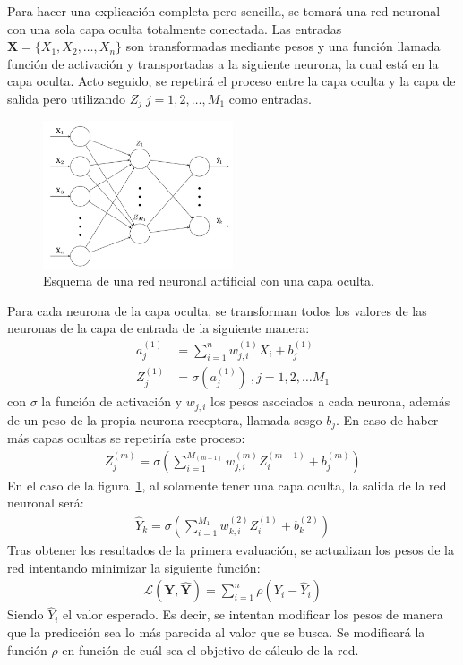 \documentclass[11pt]{book}
\theoremstyle{plain} %
\theoremstyle{definition} %
\begin{document}
Para hacer una explicación completa pero sencilla, se tomará una red neuronal con 
una sola capa oculta totalmente conectada. Las entradas 
$ \mathbf{X}= \{X_{1}, X_{2}, \dots, X_{n} \}$  son 
transformadas mediante pesos y una función llamada función de activación y transportadas 
a la siguiente neurona, la cual está en la capa oculta. Acto seguido, se repetirá el proceso 
entre la capa oculta y la capa de salida pero utilizando $Z_j \; j= 1, 2, \dots, M_1$ como 
entradas.

\begin{figure}[h]
    \centering
    \includegraphics[width=0.5\textwidth]{picture1.jpg} 
    \caption{Esquema de una red neuronal artificial con una capa oculta.}
    \label{fig:miImagen} 
\end{figure}

Para cada neurona de la capa oculta, se transforman todos los valores de las neuronas 
de la capa de entrada de la siguiente manera:
\begin{align*}
    a_j^{(1)} &= \sum_{i=1}^n w_{j,i}^{(1)}X_i+b_{j}^{(1)}\\
    Z_j^{(1)} &= \sigma(a_j^{(1)})\:, j = 1, 2, \dots M_1
\end{align*}
con $\sigma$ la función de activación y $w_{j,i}$ los pesos asociados a cada neurona, 
además de un peso de la propia neurona receptora, llamada sesgo $b_{j}$. En caso de 
haber más  capas ocultas se repetiría este proceso:
\begin{align*}
    Z_j^{(m)} = \sigma\left(\sum_{i = 1}^{M_{(m-1)}}w_{j,i}^{(m)}Z_i^{(m-1)}+b_{j}^{(m)}\right)
\end{align*}
En el caso de la figura~\ref{fig:miImagen}, al solamente tener una capa oculta, la salida de la red 
neuronal será:
\begin{align*}
\hat{Y}_k = \sigma\left(\sum_{i=1}^{M_1} w_{k,i}^{(2)}Z_i^{(1)}+b_{k}^{(2)}\right)
\end{align*}
Tras obtener los resultados de la primera evaluación, se actualizan los pesos de la 
red intentando minimizar la siguiente función:
\begin{align*}
   \mathcal{L}(\mathbf{Y}, \mathbf{\hat{Y}}) = \sum_{i=1}^n \rho(Y_i - \hat{Y}_i)
\end{align*}
Siendo $\hat{Y}_i$ el valor esperado. Es decir, se intentan modificar los pesos de manera que 
la predicción sea lo más parecida al valor que se busca. Se modificará la función $\rho$ 
en función de cuál sea el objetivo de cálculo de la red. \\
\end{document}
